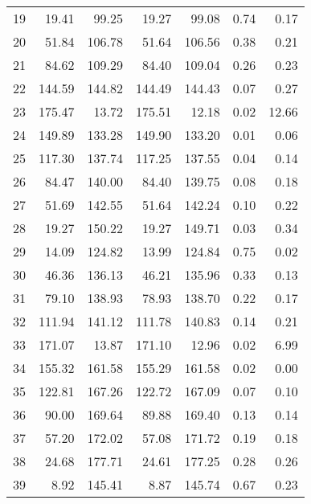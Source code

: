 \begin{tabular}{lrrrrrr}
19 &    19.41 &    99.25 &      19.27 &      99.08 &          0.74 &          0.17 \\
20 &    51.84 &   106.78 &      51.64 &     106.56 &          0.38 &          0.21 \\
21 &    84.62 &   109.29 &      84.40 &     109.04 &          0.26 &          0.23 \\
22 &   144.59 &   144.82 &     144.49 &     144.43 &          0.07 &          0.27 \\
23 &   175.47 &    13.72 &     175.51 &      12.18 &          0.02 &         12.66 \\
24 &   149.89 &   133.28 &     149.90 &     133.20 &          0.01 &          0.06 \\
25 &   117.30 &   137.74 &     117.25 &     137.55 &          0.04 &          0.14 \\
26 &    84.47 &   140.00 &      84.40 &     139.75 &          0.08 &          0.18 \\
27 &    51.69 &   142.55 &      51.64 &     142.24 &          0.10 &          0.22 \\
28 &    19.27 &   150.22 &      19.27 &     149.71 &          0.03 &          0.34 \\
29 &    14.09 &   124.82 &      13.99 &     124.84 &          0.75 &          0.02 \\
30 &    46.36 &   136.13 &      46.21 &     135.96 &          0.33 &          0.13 \\
31 &    79.10 &   138.93 &      78.93 &     138.70 &          0.22 &          0.17 \\
32 &   111.94 &   141.12 &     111.78 &     140.83 &          0.14 &          0.21 \\
33 &   171.07 &    13.87 &     171.10 &      12.96 &          0.02 &          6.99 \\
34 &   155.32 &   161.58 &     155.29 &     161.58 &          0.02 &          0.00 \\
35 &   122.81 &   167.26 &     122.72 &     167.09 &          0.07 &          0.10 \\
36 &    90.00 &   169.64 &      89.88 &     169.40 &          0.13 &          0.14 \\
37 &    57.20 &   172.02 &      57.08 &     171.72 &          0.19 &          0.18 \\
38 &    24.68 &   177.71 &      24.61 &     177.25 &          0.28 &          0.26 \\
39 &     8.92 &   145.41 &       8.87 &     145.74 &          0.67 &          0.23 \\

\end{tabular}
